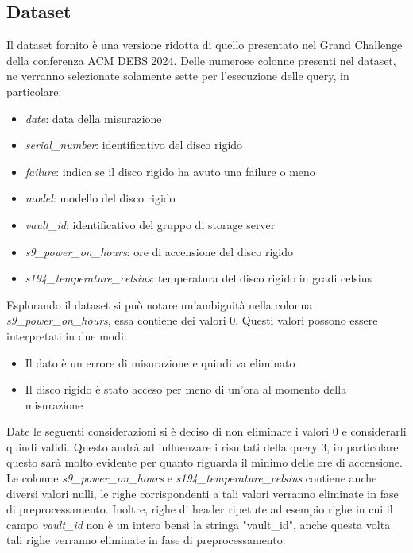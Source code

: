 \documentclass[conference]{IEEEtran}
\begin{document}
\subsection{Dataset}
Il dataset fornito è una versione ridotta di quello presentato nel Grand Challenge della conferenza ACM DEBS 2024. Delle numerose colonne presenti nel dataset, ne verranno selezionate solamente sette per l'esecuzione delle query, in particolare:
\begin{itemize}
    \item \textit{date}: data della misurazione
    \item \textit{serial\_number}: identificativo del disco rigido
    \item \textit{failure}: indica se il disco rigido ha avuto una failure o meno
    \item \textit{model}: modello del disco rigido
    \item \textit{vault\_id}: identificativo del gruppo di storage server
    \item \textit{s9\_power\_on\_hours}: ore di accensione del disco rigido
    \item \textit{s194\_temperature\_celsius}: temperatura del disco rigido in gradi celsius
\end{itemize}
Esplorando il dataset si può notare un'ambiguità nella colonna \textit{s9\_power\_on\_hours}, essa contiene dei valori 0. Questi valori possono essere interpretati in due modi:
\begin{itemize}
    \item Il dato è un errore di misurazione e quindi va eliminato
    \item Il disco rigido è stato acceso per meno di un'ora al momento della misurazione
\end{itemize}
Date le seguenti considerazioni si è deciso di non eliminare i valori 0 e considerarli quindi validi. Questo andrà ad influenzare i risultati della query 3, in particolare questo sarà molto evidente per quanto riguarda il minimo delle ore di accensione.
Le colonne \textit{s9\_power\_on\_hours} e \textit{s194\_temperature\_celsius} contiene anche diversi valori nulli, le righe corrispondenti a tali valori verranno eliminate in fase di preprocessamento.
Inoltre, righe di header ripetute ad esempio righe in cui il campo \textit{vault\_id} non è un intero bensì la stringa "vault\_id", anche questa volta tali righe verranno eliminate in fase di preprocessamento.
\end{document}
